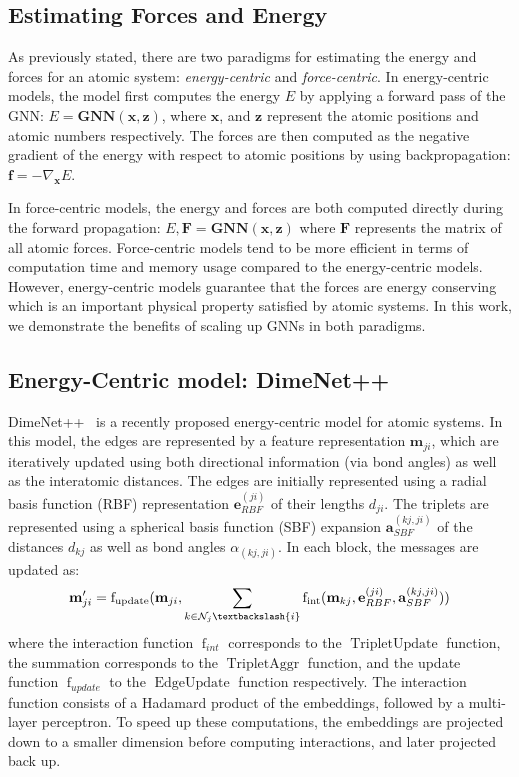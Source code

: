 \documentclass{article} \usepackage{iclr2022_conference,times}
\newcommand{\xx}{\mathbf{x}}
\newcommand{\ff}{\mathbf{f}}
\newcommand{\zz}{\mathbf{z}}
\newcommand{\FF}{\mathbf{F}}
\newcommand{\GG}{\mathbf{GNN}}
\newcommand{\ee}{\mathbf{e}}
\newcommand{\mm}{\mathbf{m}}
\newcommand{\aaa}{\mathbf{a}}
\newcommand{\N}{\mathcal{N}}
\DeclareMathOperator{\F}{f}
\DeclareMathOperator{\Fint}{f_{int}}
\DeclareMathOperator{\Fupdate}{f_{update}}
\DeclareMathOperator{\TU}{TripletUpdate}
\DeclareMathOperator{\EU}{EdgeUpdate}
\DeclareMathOperator{\TA}{TripletAggr}
\begin{document}
\subsection{Estimating Forces and Energy}

As previously stated, there are two paradigms for estimating the energy and forces for an atomic system: \emph{energy-centric} and \emph{force-centric}. In energy-centric models, the model first computes the energy $E$ by applying a forward pass of the GNN: $E = \GG(\xx, \zz)$, where $\xx$, and $\zz$ represent the atomic positions and atomic numbers respectively. The forces are then computed as the negative gradient of the energy with respect to atomic positions by using backpropagation: $\ff = -\nabla_{\xx} E$.

In force-centric models, the energy and forces are both computed directly during the forward propagation: $E, \FF = \GG(\xx, \zz)$ where $\FF$ represents the matrix of all atomic forces. Force-centric models tend to be more efficient in terms of computation time and memory usage compared to the energy-centric models. However, energy-centric models guarantee that the forces are energy conserving which is an important physical property satisfied by atomic systems. In this work, we demonstrate the benefits of scaling up GNNs in both paradigms.

\subsection{Energy-Centric model: DimeNet++}

DimeNet++~\citep{klicpera_dimenetpp_2020} is a recently proposed energy-centric model for atomic systems. In this model, the edges are represented by a feature representation $\mm_{ji}$, which are iteratively updated using both directional information (via bond angles) as well as the interatomic distances. The edges are initially represented using a radial basis function (RBF) representation $\ee^{(ji)}_{RBF}$ of their lengths $d_{ji}$. The triplets are represented using a spherical basis function (SBF) expansion $\aaa^{(kj,ji)}_{SBF}$ of the distances $d_{kj}$ as well as bond angles $\alpha_{(kj,ji)}$. In each block, the messages are updated as:
\begin{equation}
    \mm_{ji}' = \Fupdate (\mm_{ji}, \sum_{k\in \N_j \textbackslash \{i\}} \Fint(\mm_{kj}, \ee^{(ji)}_{RBF}, \aaa^{(kj,ji)}_{SBF}))
\end{equation}
where the interaction function $\F_{int}$ corresponds to the $\TU$ function, the summation corresponds to the $\TA$ function, and the update function $\F_{update}$ to the $\EU$ function respectively. The interaction function consists of a Hadamard product of the embeddings, followed by a multi-layer perceptron. To speed up these computations, the embeddings are projected down to a smaller dimension before computing interactions, and later projected back up.
\end{document}
